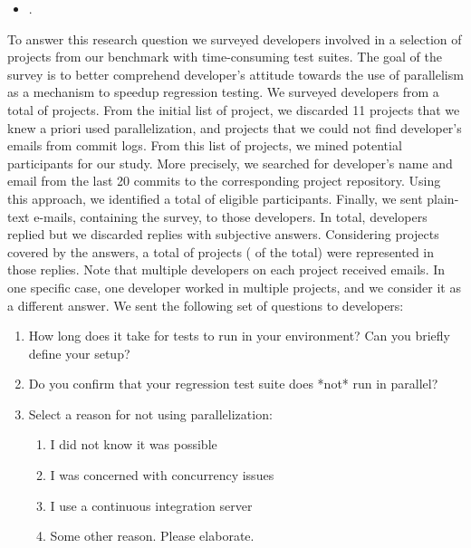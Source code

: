 \begin{itemize}
  \item \numRQAdoptionTwo{}. \textbf{\RQAdoptionTwo{}}
\end{itemize}

To answer this research question we surveyed developers involved in a
selection of projects from our benchmark with time-consuming test
suites.  The goal of the survey is to better comprehend developer's
attitude towards the use of parallelism as a mechanism to speedup
regression testing.  We surveyed developers from a total of
\emailsProjects{} projects.  From the initial list of \numMedLong{}
project, we discarded 11 projects that we knew a priori used
parallelization, and \discartedProjects{} projects that we could not find
developer's emails from commit logs.  From this list of projects, we
mined potential participants for our study.  More precisely, we
searched for developer's name and email from the last 20 commits to
the corresponding project repository.  Using this approach, we
identified a total of \emailsSent{} eligible participants.  Finally,
we sent plain-text e-mails, containing the survey, to those developers.  In
total, \emailsAnswered{} developers replied but we discarded
\emailsFalseAnswers{} replies with subjective answers.  Considering
projects covered by the answers, a total of \emailsProjectsAnswered{}
projects (\percEmailsProjectsAnswered{} of the total) were represented
in those replies. Note that multiple developers on each project
received emails. In one specific case, one developer worked in
  multiple projects, and we consider it as a different answer. We sent the following set of questions to
developers:

\begin{enumerate}
\item How long does it take for tests to run in your environment? Can
  you briefly define your setup?
\item Do you confirm that your regression test suite does *not* run in parallel?
\item\label{questionThree} Select a reason for not using parallelization:
  \begin{enumerate}[label=\alph*)]
  \item I did not know it was possible
  \item I was concerned with concurrency issues
  \item I use a continuous integration server
  \item Some other reason. Please elaborate.
  \end{enumerate}
\end{enumerate}

